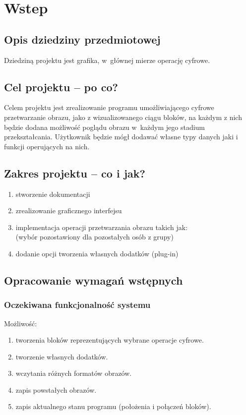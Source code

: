 \section{Wstep}
\subsection{Opis dziedziny przedmiotowej}
Dziedziną projektu jest grafika, w~głównej mierze operację cyfrowe. 
\subsection{Cel projektu – po co?}
Celem projektu jest zrealizowanie programu umożliwiającego cyfrowe przetwarzanie obrazu, jako z wizualizowanego ciągu bloków, na każdym z nich będzie dodana możliwość poglądu obrazu w~każdym jego stadium przekształcania. Użytkownik będzie mógł dodawać własne typy danych jaki i funkcji operujących na nich. 
\subsection{Zakres projektu – co i jak?}
\begin{enumerate}
\item stworzenie dokumentacji
\item zrealizowanie graficznego interfejsu
\item implementacja operacji przetwarzania obrazu takich jak: \\
(wybór pozostawiony dla pozostałych osób z grupy)
\item dodanie opcji tworzenia własnych dodatków (plug-in)
\end{enumerate}
\subsection{Opracowanie wymagań wstępnych}
\subsubsection{Oczekiwana funkcjonalność systemu}
Możliwość:
\begin{enumerate}
 \item tworzenia bloków reprezentujących wybrane operacje cyfrowe.
 \item tworzenie własnych dodatków.
 \item wczytania różnych formatów obrazów.
 \item zapis powstałych obrazów.
 \item zapis aktualnego stanu programu (położenia i połączeń bloków).
\end{enumerate}
